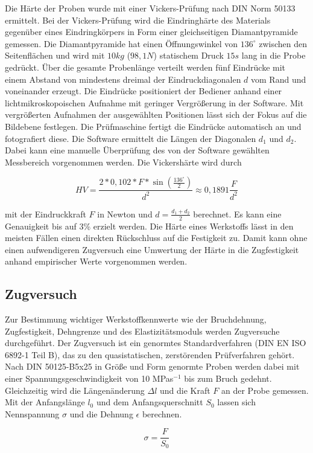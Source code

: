 Die Härte der Proben wurde mit einer Vickers-Prüfung nach DIN Norm 50133 ermittelt. Bei der Vickers-Prüfung wird die Eindringhärte des Materials gegenüber eines Eindringkörpers in Form einer gleichseitigen Diamantpyramide gemessen. Die Diamantpyramide hat einen Öffnungswinkel von $136^\circ$ zwischen den Seitenflächen und wird mit $10 kg$ ($98,1 N$) statischem Druck $15 s$ lang in die Probe gedrückt. Über die gesamte Probenlänge verteilt werden fünf Eindrücke mit einem Abstand von mindestens dreimal der Eindruckdiagonalen $d$ vom Rand und voneinander erzeugt. Die Eindrücke positioniert der Bediener anhand einer lichtmikroskopoischen Aufnahme mit geringer Vergrößerung in der Software. Mit vergrößerten Aufnahmen der ausgewählten Positionen lässt sich der Fokus auf die Bildebene festlegen. Die Prüfmaschine fertigt die Eindrücke automatisch an und fotografiert diese. Die Software ermittelt die Längen der Diagonalen $d_1$ und $d_2$. Dabei kann eine manuelle Überprüfung des von der Software gewählten Messbereich vorgenommen werden. Die Vickershärte wird durch

$$HV=\frac {2*0,102*F*\sin \left( \frac{136^\circ}{2}\right) } {d^2} \approx 0,1891 \frac{F}{d^2}$$

mit der Eindruckkraft $F$ in Newton und $d=\frac {d_1 + d_2}{2} $ berechnet. Es kann eine Genauigkeit bis auf 3\% erzielt werden.  Die Härte eines Werkstoffs lässt in den meisten Fällen einen direkten Rückschluss auf die Festigkeit zu. Damit kann ohne einen aufwendigeren Zugversuch eine Umwertung der Härte in die Zugfestigkeit anhand empirischer Werte vorgenommen werden. 

\subsection{Zugversuch}
Zur Bestimmung wichtiger Werkstoffkennwerte wie der Bruchdehnung, Zugfestigkeit, Dehngrenze und des Elastizitätsmoduls werden Zugversuche durchgeführt. Der Zugversuch ist ein genormtes Standardverfahren (DIN EN ISO 6892-1 Teil B), das zu den quasistatischen, zerstörenden Prüfverfahren gehört. Nach DIN 50125-B5x25 in Größe und Form genormte Proben werden dabei mit einer Spannungsgeschwindigkeit von 10 MPas$^{-1}$ bis zum Bruch gedehnt. Gleichzeitig wird die Längenänderung $\Delta l$ und die Kraft $F$ an der Probe gemessen. Mit der Anfangslänge $l_0$ und dem Anfangsquerschnitt $S_0$ lassen sich Nennspannung $\sigma$ und die Dehnung $\epsilon$ berechnen.

$$\sigma=\frac{F}{S_0}$$

